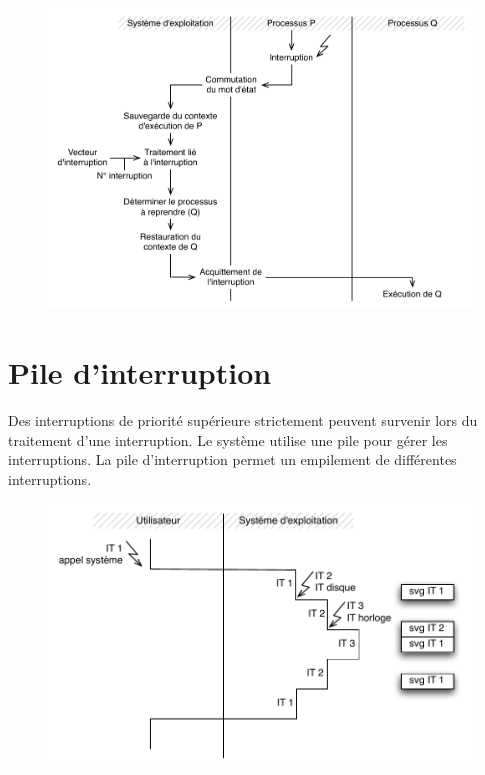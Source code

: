 \documentclass[11pt,english,french]{scrreprt}
\theoremstyle{remark}
\theoremstyle{definition}
\begin{document}
\begin{figure}[h!]
	\center
	\includegraphics[scale=.6]{img/interruption}
	\vspace{-15pt}
\end{figure}

\section{Pile d'interruption} %
Des interruptions de priorité supérieure strictement peuvent survenir lors du traitement d'une interruption. Le système utilise une pile pour gérer les interruptions. La pile d'interruption permet un empilement de différentes interruptions.

\begin{figure}[h!]
	\center
	\includegraphics[scale=.6]{img/pile-interruptions}
	\vspace{-15pt}
\end{figure}
\end{document}
